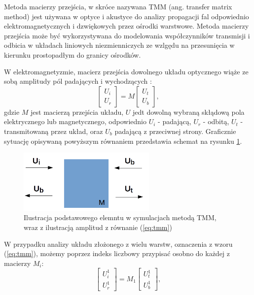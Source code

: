 \label{subart:tmm}
Metoda macierzy przejścia, w skróce nazywana TMM (ang. transfer matrix method) jest używana w optyce i akustyce do analizy propagacji fal odpowiednio elektromagnetycznych i dzwiękowych przez ośrodki warstwowe. Metoda macierzy przejścia może być wykorzystywana do modelowania współczynników transmisji i odbicia w układach liniowych niezmienniczych ze wzlgędu na przesunięcia w kierunku prostopadłym do granicy ośrodków.

W elektromagnetyzmie, macierz przejścia dowolnego układu optycznego wiąże ze sobą amplitudy pól padających i wychodzących \cite{teich1991fundamentals,markos2008wave}:
\begin{equation}
\begin{bmatrix}
U_i \\ 
U_r
\end{bmatrix}
= M 
\begin{bmatrix}
U_t \\
U_b
\end{bmatrix},
\label{eq:tmm}
\end{equation}
gdzie $M$ jest macierzą przejścia układu, $U$ jedt dowolną wybraną skłądową pola elektrycznego lub magnetycznego, odpowiednio $U_i$ - padającą, $U_r$ - odbitą, $U_t$ - transmitowaną przez układ, oraz $U_b$ padającą  z przeciwnej strony. Graficznie sytuację opisywaną powyższym równaniem przedstawia schemat na rysunku \ref{fig:tmm-simple}.

\begin{figure}
	\includegraphics[width=0.6\textwidth]{images/tmm.png}
	\caption{Ilustracja podstawowego elemntu w symulacjach metodą TMM, wraz z ilustracją amplitud z równanie (\ref{eq:tmm}) }
	\label{fig:tmm-simple}
\end{figure}

W przypadku analizy układu złożonego z wielu warstw, oznaczenia z wzoru (\ref{eq:tmm}), możemy poprzez indeks liczbowy przypisać osobno do każdej z macierzy $M_i$:
\begin{equation}
\begin{bmatrix}
U_i^1 \\ 
U_r^1
\end{bmatrix}
= M_1 
\begin{bmatrix}
U_t^1 \\
U_b^1
\end{bmatrix},
\label{eq:tmm-1l}
\end{equation}

